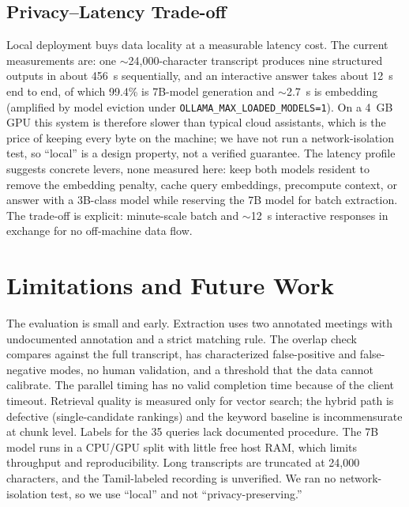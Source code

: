 \documentclass[conference]{IEEEtran}
\begin{document}
\subsection{Privacy--Latency Trade-off}
\label{sec:tradeoff}
Local deployment buys data locality at a measurable latency cost. The current measurements are: one $\sim$24,000-character transcript produces nine structured outputs in about 456~s sequentially, and an interactive answer takes about 12~s end to end, of which 99.4\% is 7B-model generation and $\sim$2.7~s is embedding (amplified by model eviction under \texttt{OLLAMA\_MAX\_LOADED\_MODELS=1}). On a 4~GB GPU this system is therefore slower than typical cloud assistants, which is the price of keeping every byte on the machine; we have not run a network-isolation test, so ``local'' is a design property, not a verified guarantee. The latency profile suggests concrete levers, none measured here: keep both models resident to remove the embedding penalty, cache query embeddings, precompute context, or answer with a 3B-class model while reserving the 7B model for batch extraction. The trade-off is explicit: minute-scale batch and $\sim$12~s interactive responses in exchange for no off-machine data flow.

\section{Limitations and Future Work}
\label{sec:limits}
The evaluation is small and early. Extraction uses two annotated meetings with undocumented annotation and a strict matching rule. The overlap check compares against the full transcript, has characterized false-positive and false-negative modes, no human validation, and a threshold that the data cannot calibrate. The parallel timing has no valid completion time because of the client timeout. Retrieval quality is measured only for vector search; the hybrid path is defective (single-candidate rankings) and the keyword baseline is incommensurate at chunk level. Labels for the 35 queries lack documented procedure. The 7B model runs in a CPU/GPU split with little free host RAM, which limits throughput and reproducibility. Long transcripts are truncated at 24,000 characters, and the Tamil-labeled recording is unverified. We ran no network-isolation test, so we use ``local'' and not ``privacy-preserving.''
\end{document}
